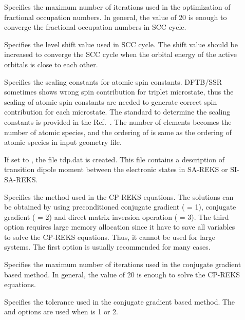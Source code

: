 \begin{description}
  \item[] Specifies the maximum number of iterations used in the optimization of
    fractional occupation numbers. In general, the value of 20 is enough to converge the fractional
    occupation numbers in SCC cycle.

  \item[] Specifies the level shift value used in SCC cycle. The shift value should be increased
    to converge the SCC cycle when the orbital energy of the active orbitals is close to each other.

  \item[] Specifies the scaling constants for atomic spin constants. DFTB/SSR sometimes
    shows wrong spin contribution for triplet microstate, thus the scaling of atomic spin constants are needed
    to generate correct spin contribution for each microstate. The standard to determine the scaling constants
    is provided in the Ref.~\cite{Lee_JCTC_2019}. The number of  elements becomes the number of
    atomic species, and the ordering of  is same as the ordering of atomic species in input geometry file.

  \item[] If set to , the file tdp.dat is created. This file contains a
    description of transition dipole moment between the electronic states in SA-REKS or SI-SA-REKS.

  \item[] Specifies the method used in the CP-REKS equations. The solutions
    can be obtained by using preconditioned conjugate gradient ( = 1), conjugate
    gradient ( = 2) and direct matrix inversion operation ( = 3).
    The third option requires large memory allocation since it have to save all variables to solve the
    CP-REKS equations. Thus, it cannot be used for large systems. The first option is usually
    recommended for many cases.

  \item[] Specifies the maximum number of iterations used in the conjugate gradient
    based method. In general, the value of 20 is enough to solve the CP-REKS equations.

  \item[] Specifies the tolerance used in the conjugate gradient based method.
    The  and  options are used when  is 1 or 2.


\end{description}
